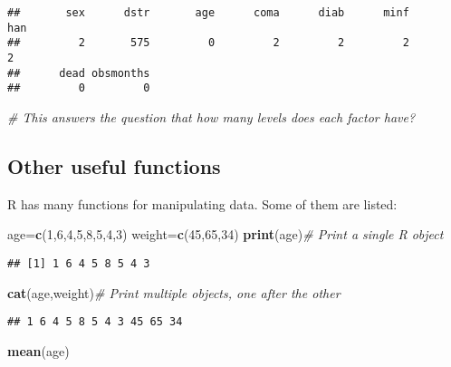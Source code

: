 \documentclass[]{book}
\newenvironment{Shaded}{\begin{snugshade}}{\end{snugshade}}
\newcommand{\KeywordTok}[1]{\textcolor[rgb]{0.13,0.29,0.53}{\textbf{#1}}}
\newcommand{\DecValTok}[1]{\textcolor[rgb]{0.00,0.00,0.81}{#1}}
\newcommand{\CommentTok}[1]{\textcolor[rgb]{0.56,0.35,0.01}{\textit{#1}}}
\newcommand{\NormalTok}[1]{#1}
\theoremstyle{definition}
\theoremstyle{definition}
\theoremstyle{definition}
\theoremstyle{remark}
\begin{document}
\begin{verbatim}
##       sex      dstr       age      coma      diab      minf       han 
##         2       575         0         2         2         2         2 
##      dead obsmonths 
##         0         0
\end{verbatim}

\begin{Shaded}
\begin{Highlighting}[]
\CommentTok{# This answers the question that how many levels does each factor have?}
\end{Highlighting}
\end{Shaded}

\subsection{Other useful functions}\label{other-useful-functions}

R has many functions for manipulating data. Some of them are listed:

\begin{Shaded}
\begin{Highlighting}[]
\NormalTok{age=}\KeywordTok{c}\NormalTok{(}\DecValTok{1}\NormalTok{,}\DecValTok{6}\NormalTok{,}\DecValTok{4}\NormalTok{,}\DecValTok{5}\NormalTok{,}\DecValTok{8}\NormalTok{,}\DecValTok{5}\NormalTok{,}\DecValTok{4}\NormalTok{,}\DecValTok{3}\NormalTok{)}
\NormalTok{weight=}\KeywordTok{c}\NormalTok{(}\DecValTok{45}\NormalTok{,}\DecValTok{65}\NormalTok{,}\DecValTok{34}\NormalTok{)}
\KeywordTok{print}\NormalTok{(age)}\CommentTok{# Print a single R object}
\end{Highlighting}
\end{Shaded}

\begin{verbatim}
## [1] 1 6 4 5 8 5 4 3
\end{verbatim}

\begin{Shaded}
\begin{Highlighting}[]
\KeywordTok{cat}\NormalTok{(age,weight)}\CommentTok{# Print multiple objects, one after the other }
\end{Highlighting}
\end{Shaded}

\begin{verbatim}
## 1 6 4 5 8 5 4 3 45 65 34
\end{verbatim}

\begin{Shaded}
\begin{Highlighting}[]
\KeywordTok{mean}\NormalTok{(age)}
\end{Highlighting}
\end{Shaded}
\end{document}
